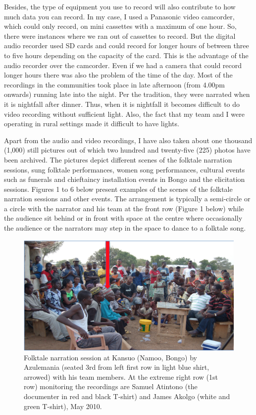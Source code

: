 \documentclass[output=paper,colorlinks,citecolor=brown]{langscibook}
\begin{document}
Besides, the type of equipment you use to record will also contribute to how much data you can record.  In my case, I used a Panasonic video camcorder, which could only record, on mini cassettes with a maximum of one hour. So, there were instances where we ran out of cassettes to record. But the digital audio recorder used SD cards and could record for longer hours of between three to five hours depending on the capacity of the card.  This is the advantage of the audio recorder over the camcorder. Even if we had a camera that could record longer hours there was also the problem of the time of the day. Most of the recordings in the communities took place in  late afternoon (from 4.00pm onwards) running late into the night. Per the tradition, they were narrated when it is nightfall after dinner. Thus, when it is nightfall it becomes difficult to do video recording without sufficient light. Also, the fact that my team and I were operating in rural settings made it difficult to have lights.

Apart from the audio and video recordings, I have also taken about one thousand (1,000) still pictures out of which two hundred and twenty-five (225) photos have been archived. The pictures depict different scenes of the folktale narration sessions, sung folktale performances, women song performances, cultural events such as funerals and chieftaincy installation events in Bongo and the elicitation sessions. Figures 1 to 6 below present examples of the scenes of the folktale narration sessions and other events. The arrangement is typically a semi-circle or a circle with the narrator and his team at the front row (Figure 1 below) while the audience sit behind or in front with space at the centre where occasionally the audience or the narrators may step in the space to dance to a folktale song.

\begin{figure}
\includegraphics[width=\textwidth]{figures/azulemania.png}
\caption{Folktale narration session at Kansuo (Namoo, Bongo) by Azulemania (seated 3rd from left first row 
 	 in light blue shirt, arrowed) with his team members. At the extreme right row (1st row) monitoring 
 	the recordings are Samuel Atintono (the documenter in red and black T-shirt) and James Akolgo 
 	(white and green T-shirt), May 2010.}
\end{figure}
\end{document}
